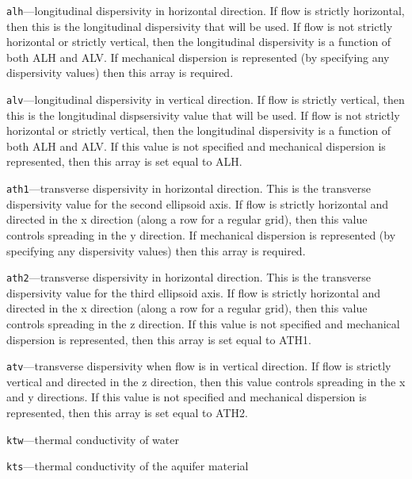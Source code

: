 \begin{description}
\item \texttt{alh}---longitudinal dispersivity in horizontal direction.  If flow is strictly horizontal, then this is the longitudinal dispersivity that will be used.  If flow is not strictly horizontal or strictly vertical, then the longitudinal dispersivity is a function of both ALH and ALV.  If mechanical dispersion is represented (by specifying any dispersivity values) then this array is required.

\item \texttt{alv}---longitudinal dispersivity in vertical direction.  If flow is strictly vertical, then this is the longitudinal dispsersivity value that will be used.  If flow is not strictly horizontal or strictly vertical, then the longitudinal dispersivity is a function of both ALH and ALV.  If this value is not specified and mechanical dispersion is represented, then this array is set equal to ALH.

\item \texttt{ath1}---transverse dispersivity in horizontal direction.  This is the transverse dispersivity value for the second ellipsoid axis.  If flow is strictly horizontal and directed in the x direction (along a row for a regular grid), then this value controls spreading in the y direction.  If mechanical dispersion is represented (by specifying any dispersivity values) then this array is required.

\item \texttt{ath2}---transverse dispersivity in horizontal direction.  This is the transverse dispersivity value for the third ellipsoid axis.  If flow is strictly horizontal and directed in the x direction (along a row for a regular grid), then this value controls spreading in the z direction.  If this value is not specified and mechanical dispersion is represented, then this array is set equal to ATH1.

\item \texttt{atv}---transverse dispersivity when flow is in vertical direction.  If flow is strictly vertical and directed in the z direction, then this value controls spreading in the x and y directions.  If this value is not specified and mechanical dispersion is represented, then this array is set equal to ATH2.

\item \texttt{ktw}---thermal conductivity of water

\item \texttt{kts}---thermal conductivity of the aquifer material

\end{description}

